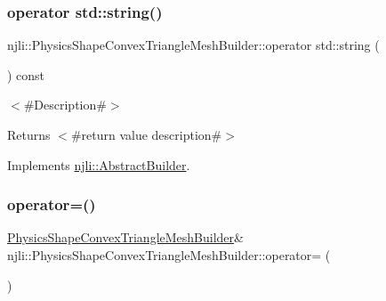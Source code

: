 \subsubsection{\texorpdfstring{operator std\+::string()}{operator std::string()}}
{\footnotesize\ttfamily njli\+::\+Physics\+Shape\+Convex\+Triangle\+Mesh\+Builder\+::operator std\+::string (\begin{DoxyParamCaption}{ }\end{DoxyParamCaption}) const\hspace{0.3cm}{\ttfamily [virtual]}}

$<$\#\+Description\#$>$

\begin{DoxyReturn}{Returns}
$<$\#return value description\#$>$ 
\end{DoxyReturn}


Implements \mbox{\hyperlink{classnjli_1_1_abstract_builder_a3e6e553e06d1ca30517ad5fb0bd4d000}{njli\+::\+Abstract\+Builder}}.

\mbox{\label{classnjli_1_1_physics_shape_convex_triangle_mesh_builder_ae1b7f1e588a09a5ad8b3fba70dda119c}} 
\subsubsection{\texorpdfstring{operator=()}{operator=()}}
{\footnotesize\ttfamily \mbox{\hyperlink{classnjli_1_1_physics_shape_convex_triangle_mesh_builder}{Physics\+Shape\+Convex\+Triangle\+Mesh\+Builder}}\& njli\+::\+Physics\+Shape\+Convex\+Triangle\+Mesh\+Builder\+::operator= (\begin{DoxyParamCaption}\item[{const \mbox{\hyperlink{classnjli_1_1_physics_shape_convex_triangle_mesh_builder}{Physics\+Shape\+Convex\+Triangle\+Mesh\+Builder}} \&}]{ }\end{DoxyParamCaption})\hspace{0.3cm}{\ttfamily [protected]}}

\mbox{\label{classnjli_1_1_physics_shape_convex_triangle_mesh_builder_a96fabe0bd23c01c752b08a547ab2cad2}} 
